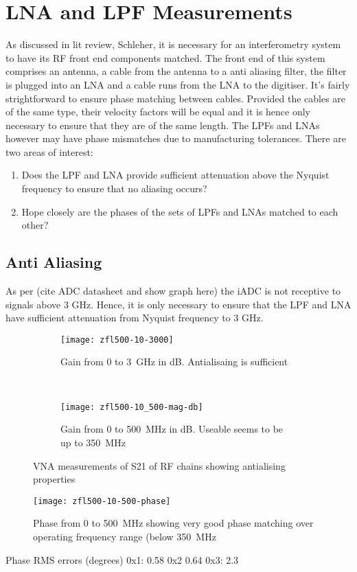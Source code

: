 \chapter{LNA and LPF Measurements}
As discussed in lit review, Schleher, it is necessary for an interferometry system to have its RF front end components matched. The front end of this system comprises an antenna, a cable from the antenna to a anti aliasing filter, the filter is plugged into an LNA and a cable runs from the LNA to the digitiser. 
It's fairly strightforward to ensure phase matching between cables. Provided the cables are of the same type, their velocity factors will be equal and it is hence only necessary to ensure that they are of the same length.
The LPFs and LNAs however may have phase mismatches due to manufacturing tolerances. 
There are two areas of interest:
\begin{enumerate}
  \item Does the LPF and LNA provide sufficient attenuation above the Nyquist frequency to ensure that no aliasing occurs?
  \item Hope closely are the phases of the sets of LPFs and LNAs matched to each other?
\end{enumerate}

\section{Anti Aliasing}
As per (cite ADC datasheet and show graph here) the iADC is not receptive to signals above 3 GHz. Hence, it is only necessary to ensure that the LPF and LNA have sufficient attenuation from Nyquist frequency to 3 GHz. 

\begin{figure}
  \centering
  \begin{subfigure}{\textwidth}
    \centering
    \texttt{[image: zfl500-10-3000]}
    \caption{Gain from 0 to \SI{3}{\giga\hertz} in dB. Antialisaing is sufficient}
  \end{subfigure}\\[1em]
  \begin{subfigure}{\textwidth}
    \centering
    \texttt{[image: zfl500-10\_500-mag-db]}
    \caption{Gain from 0 to \SI{500}{\mega\hertz} in dB. Useable seems to be up to \SI{350}{\mega\hertz}}
  \end{subfigure}
  \caption{VNA measurements of S21 of RF chains showing antialising properties}
\end{figure}
\begin{figure}
  \centering
  \texttt{[image: zfl500-10-500-phase]}
  \caption{Phase from 0 to \SI{500}{\mega\hertz} showing very good phase matching over operating frequency range (below \SI{350}{\mega\hertz}}
\end{figure}

Phase RMS errors (degrees)
0x1: 0.58
0x2 0.64
0x3: 2.3
